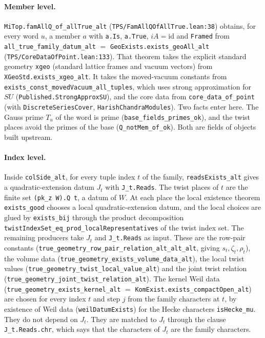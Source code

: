 \documentclass[11pt]{article}
\newcommand{\lean}[1]{\nolinkurl{#1}}
\newcommand{\Lpath}[1]{\nolinkurl{#1}}
\theoremstyle{remark}
\begin{document}
\paragraph{Member level.} \lean{MiTop.famAllQ_of_allTrue_alt} (\Lpath{TPS/FamAllQOfAllTrue.lean:38}) obtains, for every word $u$, a member $a$ with \lean{a.Is}, \lean{a.True}, $iA=\mathrm{id}$ and \lean{Framed} from \lean{all_true_family_datum_alt} $=$ \lean{GeoExists.exists_geoAll_alt} (\Lpath{TPS/CoreDataOfPoint.lean:133}). That theorem takes the explicit standard geometry \lean{xgeo} (standard lattice frames and vacuum vectors) from \lean{XGeoStd.exists_xgeo_alt}. It takes the moved-vacuum constants from \lean{exists_const_movedVacuum_all_tuples}, which uses strong approximation for $SU$ (\lean{Published.StrongApproxSU}), and the core data from \lean{core_data_of_point} (with \lean{DiscreteSeriesCover}, \lean{HarishChandraModules}). Two facts enter here. The Gauss prime $T_u$ of the word is prime (\lean{base_fields_primes_ok}), and the twist places avoid the primes of the base (\lean{Q_notMem_of_ok}). Both are fields of objects built upstream.

\paragraph{Index level.} Inside \lean{colSide_alt}, for every tuple index $t$ of the family, \lean{readsExists_alt} gives a quadratic-extension datum $J_t$ with \lean{J_t.Reads}. The twist places of $t$ are the finite set \lean{(pk_z}~\lean{W).Q}~\lean{t}, a datum of $W$. At each place the local existence theorem \lean{exists_good} chooses a local quadratic-extension datum, and the local choices are glued by \lean{exists_bij} through the product decomposition \lean{twistIndexSet_eq_prod_localRepresentatives} of the twist index set. The remaining producers take $J_t$ and \lean{J_t.Reads} as input. These are the row-pair constants (\lean{true_geometry_row_pair_relation_alt_alt_alt}, giving $s_t,\zeta_t,\rho_t$), the volume data (\lean{true_geometry_exists_volume_data_alt}), the local twist values (\lean{true_geometry_twist_local_value_alt}) and the joint twist relation (\lean{true_geometry_joint_twist_relation_alt}). The kernel Weil data (\lean{true_geometry_exists_kernel_alt} $=$ \lean{KomExist.exists_compactOpen_alt}) are chosen for every index $t$ and step $j$ from the family characters at $t$, by existence of Weil data (\lean{weilDatumExists}) for the Hecke characters \lean{isHecke_mu}. They do not depend on $J_t$. They are matched to $J_t$ through the clause \lean{J_t.Reads.chr}, which says that the characters of $J_t$ are the family characters.
\end{document}
